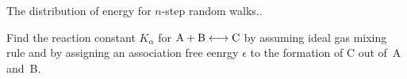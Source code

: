 \bigskip {}
The distribution of energy for $n$-step random walks..

\bigskip {}
Find the reaction constant $K_\alpha$ for
$\rm A + B \longleftrightarrow C$
by assuming ideal gas mixing rule and by assigning
an association free eenrgy $\epsilon$ to the formation
of C out of~A and~B.
